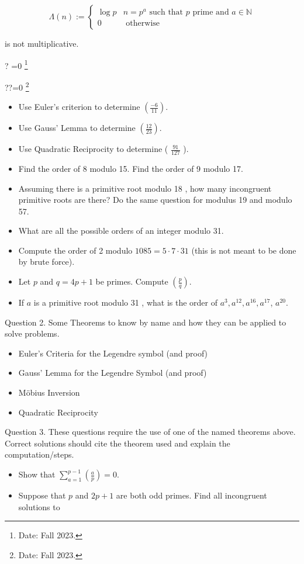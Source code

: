 \documentclass[10pt]{article}
\let\svthefootnote\thefootnote
\newcommand\blfootnotetext[1]{%
  \let\thefootnote\relax\footnote{#1}%
  \addtocounter{footnote}{-1}%
  \let\thefootnote\svthefootnote%
}
\let\svfootnotetext\footnotetext
\renewcommand\footnotetext[2][?]{%
  \if\relax#1\relax%
    \ifnum\value{footnote}=0\blfootnotetext{#2}\else\svfootnotetext{#2}\fi%
  \else%
    \if?#1\ifnum\value{footnote}=0\blfootnotetext{#2}\else\svfootnotetext{#2}\fi%
    \else\svfootnotetext[#1]{#2}\fi%
  \fi
}
\begin{document}
$$
\Lambda(n):= \begin{cases}\log p & n=p^{a} \text { such that } p \text { prime and } a \in \mathbb{N} \\ 0 & \text { otherwise }\end{cases}
$$

is not multiplicative.

\begin{itemize}
  \item Use Euler's criterion to determine $\left(\frac{-6}{11}\right)$.
  \item Use Gauss' Lemma to determine $\left(\frac{12}{23}\right)$.
  \item Use Quadratic Reciprocity to determine ( $\frac{91}{127}$ ).
  \item Find the order of 8 modulo 15. Find the order of 9 modulo 17.
  \item Assuming there is a primitive root modulo 18 , how many incongruent primitive roots are there? Do the same question for modulus 19 and modulo 57.
  \item What are all the possible orders of an integer modulo 31.
  \item Compute the order of 2 modulo $1085=5 \cdot 7 \cdot 31$ (this is not meant to be done by brute force).
  \item Let $p$ and $q=4 p+1$ be primes. Compute $\left(\frac{p}{q}\right)$.
  \item If $a$ is a primitive root modulo 31 , what is the order of $a^{3}, a^{12}, a^{16}, a^{17}$, $a^{20}$.
\end{itemize}

Question 2. Some Theorems to know by name and how they can be applied to solve problems.

\begin{itemize}
  \item Euler's Criteria for the Legendre symbol (and proof)
  \item Gauss' Lemma for the Legendre Symbol (and proof)
  \item Möbius Inversion
  \item Quadratic Reciprocity
\end{itemize}

Question 3. These questions require the use of one of the named theorems above. Correct solutions should cite the theorem used and explain the computation/steps.

\begin{itemize}
  \item Show that $\sum_{a=1}^{p-1}\left(\frac{a}{p}\right)=0$.
  \item Suppose that $p$ and $2 p+1$ are both odd primes. Find all incongruent solutions to
\end{itemize}
\end{document}
